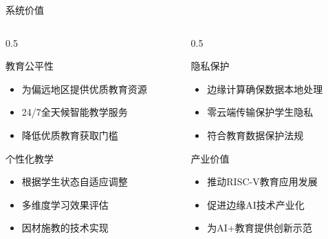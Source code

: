 \documentclass[aspectratio=169,12pt]{beamer}
\begin{document}
\begin{frame}{系统价值}
    \begin{columns}
        \begin{column}{0.5\textwidth}
            \begin{block}{教育公平性}
                \begin{itemize}
                    \item 为偏远地区提供优质教育资源
                    \item 24/7全天候智能教学服务
                    \item 降低优质教育获取门槛
                \end{itemize}
            \end{block}
            
            \begin{block}{个性化教学}
                \begin{itemize}
                    \item 根据学生状态自适应调整
                    \item 多维度学习效果评估
                    \item 因材施教的技术实现
                \end{itemize}
            \end{block}
        \end{column}
        \begin{column}{0.5\textwidth}
            \begin{block}{隐私保护}
                \begin{itemize}
                    \item 边缘计算确保数据本地处理
                    \item 零云端传输保护学生隐私
                    \item 符合教育数据保护法规
                \end{itemize}
            \end{block}
            
            \begin{block}{产业价值}
                \begin{itemize}
                    \item 推动RISC-V教育应用发展
                    \item 促进边缘AI技术产业化
                    \item 为AI+教育提供创新示范
                \end{itemize}
            \end{block}
        \end{column}
    \end{columns}
\end{frame}
\end{document}
